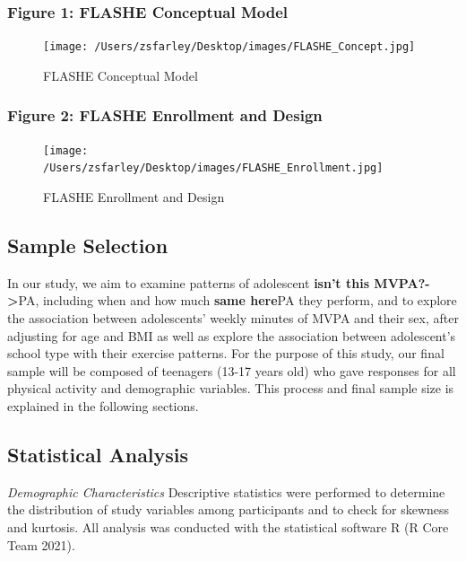\documentclass[
]{article}
\begin{document}
\hypertarget{figure-1-flashe-conceptual-model}{%
\subsubsection{Figure 1: FLASHE Conceptual
Model}\label{figure-1-flashe-conceptual-model}}

\begin{figure}
\centering
\texttt{[image: /Users/zsfarley/Desktop/images/FLASHE\_Concept.jpg]}
\caption{FLASHE Conceptual Model}
\end{figure}

\hypertarget{figure-2-flashe-enrollment-and-design}{%
\subsubsection{Figure 2: FLASHE Enrollment and
Design}\label{figure-2-flashe-enrollment-and-design}}

\begin{figure}
\centering
\texttt{[image: /Users/zsfarley/Desktop/images/FLASHE\_Enrollment.jpg]}
\caption{FLASHE Enrollment and Design}
\end{figure}

\hypertarget{sample-selection}{%
\subsection{Sample Selection}\label{sample-selection}}

In our study, we aim to examine patterns of adolescent \textbf{isn't
this MVPA?-\textgreater{}}PA, including when and how much \textbf{same
here}PA they perform, and to explore the association between
adolescents' weekly minutes of MVPA and their sex, after adjusting for
age and BMI as well as explore the association between adolescent's
school type with their exercise patterns. For the purpose of this study,
our final sample will be composed of teenagers (13-17 years old) who
gave responses for all physical activity and demographic variables. This
process and final sample size is explained in the following sections.

\hypertarget{statistical-analysis}{%
\subsection{Statistical Analysis}\label{statistical-analysis}}

\emph{Demographic Characteristics} Descriptive statistics were performed
to determine the distribution of study variables among participants and
to check for skewness and kurtosis. All analysis was conducted with the
statistical software R (R Core Team 2021).
\end{document}
